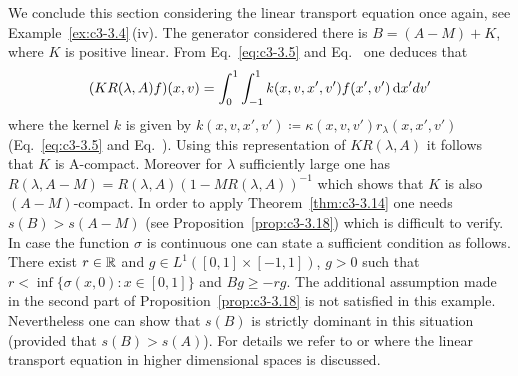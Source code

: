 We conclude this section considering the linear transport equation%
once again, see Example~\ref{ex:c3-3.4}\,(iv).
The generator considered there is $B = (A - M) + K$, where $K$ is positive linear. 
From Eq.~\eqref{eq:c3-3.5} and Eq.~ one deduces that 
\[
(KR(\lambda,A)f)(x,v) = \int_{0}^{1}\int_{-1}^{1} k(x,v,x',v')f(x',v')\mathop{}\!\mathrm{d}{x}'dv'
\]
where the kernel $k$ is given by $k(x,v,x',v') \coloneq  \kappa(x,v,v')r_{\lambda}(x,x',v')$ (\cf Eq.~\eqref{eq:c3-3.5} and Eq.~). 
Using this representation of\/ $KR(\lambda,A)$ it follows that $K$ is A-compact. 
Moreover for $\lambda$ sufficiently large one has $R(\lambda,A-M) = R(\lambda,A)(1 - MR(\lambda,A))^{-1}$ which shows that $K$ is also $(A-M)$-compact. 
In order to apply Theorem~\ref{thm:c3-3.14} one needs $s(B) > s(A-M)$ (see Proposition~\ref{prop:c3-3.18}) which is difficult to verify. 
In case the function $\sigma$ is continuous one can state a sufficient condition as follows.
There exist $r \in \mathbb{R} $ and $g \in L^{1}([0,1]\times[-1,1])$, $g > 0$ such that $r < \inf\{\sigma(x,0) \colon x \in [0,1]\}$ and $Bg \geq -rg$.
The additional assumption made in the second part of Proposition~\ref{prop:c3-3.18} is not satisfied in this example. 
Nevertheless one can show that $s(B)$ is strictly dominant in this situation (provided that $s(B) > s(A)$). 
For details we refer to \textcite{greiner:1984d}  or \textcite{voigt:1985} where the linear transport equation in higher dimensional spaces is discussed.

